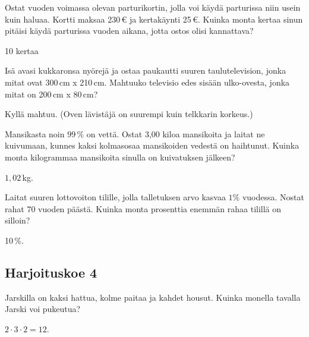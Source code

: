 	\begin{tehtava}
Ostat vuoden voimassa olevan parturikortin, jolla voi käydä parturissa niin usein kuin haluaa. Kortti maksaa 230\,€ ja kertakäynti 25\,€. Kuinka monta kertaa sinun pitäisi käydä parturissa vuoden aikana, jotta ostos olisi kannattava?
	\begin{vastaus}
	 10 kertaa
	\end{vastaus}
	\end{tehtava}
	
	\begin{tehtava}
Isä avasi kukkaronsa nyörejä ja ostaa paukautti suuren taulutelevision, jonka mitat ovat 300\,cm x 210\,cm. Mahtuuko televisio edes sisään ulko-ovesta, jonka mitat on 200\,cm x 80\,cm? %
	\begin{vastaus}
	 Kyllä mahtuu. (Oven lävistäjä on suurempi kuin telkkarin korkeus.)
	\end{vastaus}
	\end{tehtava}
	
	\begin{tehtava}
Mansikasta noin $99\,\%$ on vettä. Ostat 3,00 kiloa mansikoita ja laitat ne kuivumaan, kunnes kaksi kolmasosaa mansikoiden vedestä on haihtunut. Kuinka monta kilogrammaa mansikoita sinulla on kuivatuksen jälkeen?
	\begin{vastaus}
	 $1,02$\,kg.
	\end{vastaus}
	\end{tehtava}
	
	\begin{tehtava}
Laitat suuren lottovoiton tilille, jolla talletuksen arvo kasvaa $1 \%$ vuodessa. Nostat rahat 70 vuoden päästä. Kuinka monta prosenttia enemmän rahaa tilillä on silloin?
	\begin{vastaus}
	 10\,\%.
	\end{vastaus}
	\end{tehtava}
	
\subsection*{Harjoituskoe 4}
	
	\begin{tehtava}
Jarskilla on kaksi hattua, kolme paitaa ja kahdet housut. Kuinka monella tavalla Jarski voi pukeutua?
	 \begin{vastaus}
	  $2 \cdot 3 \cdot 2 = 12$.
	 \end{vastaus}
	 \end{tehtava}
	 
